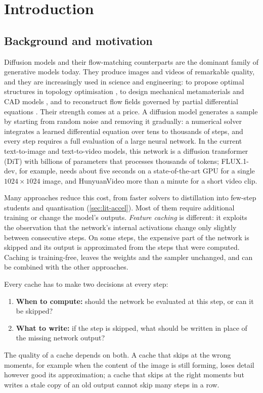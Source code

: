 \chapter{Introduction}\label{ch:introduction}

\section{Background and motivation}

Diffusion models \citep{sohl2015deep,ho2020ddpm,song2021sde} and their flow-matching counterparts \citep{lipman2023flow,liu2023rectifiedflow} are the dominant family of generative models today. They produce images and videos of remarkable quality, and they are increasingly used in science and engineering: to propose optimal structures in topology optimisation \citep{maze2023topodiff,nobari2025oat}, to design mechanical metamaterials \citep{bastek2023inverse} and CAD models \citep{xu2024brepgen}, and to reconstruct flow fields governed by partial differential equations \citep{shu2023physics,huang2024diffusionpde}. Their strength comes at a price. A diffusion model generates a sample by starting from random noise and removing it gradually: a numerical solver integrates a learned differential equation over tens to thousands of steps, and every step requires a full evaluation of a large neural network. In the current text-to-image and text-to-video models, this network is a diffusion transformer (DiT) \citep{peebles2023dit} with billions of parameters that processes thousands of tokens; FLUX.1-dev, for example, needs about five seconds on a state-of-the-art GPU for a single $1024\times1024$ image, and HunyuanVideo more than a minute for a short video clip.

Many approaches reduce this cost, from faster solvers to distillation into few-step students and quantisation (\cref{sec:lit-accel}). Most of them require additional training or change the model's outputs. \emph{Feature caching} is different: it exploits the observation that the network's internal activations change only slightly between consecutive steps. On some steps, the expensive part of the network is skipped and its output is approximated from the steps that were computed. Caching is training-free, leaves the weights and the sampler unchanged, and can be combined with the other approaches.

Every cache has to make two decisions at every step:
\begin{enumerate}
  \item \textbf{When to compute:} should the network be evaluated at this step, or can it be skipped?
  \item \textbf{What to write:} if the step is skipped, what should be written in place of the missing network output?
\end{enumerate}
The quality of a cache depends on both. A cache that skips at the wrong moments, for example when the content of the image is still forming, loses detail however good its approximation; a cache that skips at the right moments but writes a stale copy of an old output cannot skip many steps in a row.

